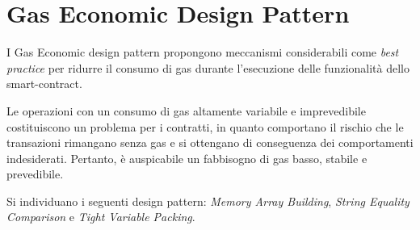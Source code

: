 {\section{Gas Economic Design Pattern}
	I Gas Economic design pattern propongono meccanismi considerabili come \textit{best practice} per ridurre il consumo di gas durante l’esecuzione delle funzionalità dello smart-contract. \par
	Le operazioni con un consumo di gas altamente variabile e imprevedibile costituiscono un problema per i contratti, in quanto comportano il rischio che le transazioni rimangano senza gas e si ottengano di conseguenza dei comportamenti indesiderati. Pertanto, è auspicabile un fabbisogno di gas basso, stabile e prevedibile.\par
	Si individuano i seguenti design pattern: \textit{Memory Array Building}, \textit{String Equality Comparison} e \textit{Tight Variable Packing}.
	
}
